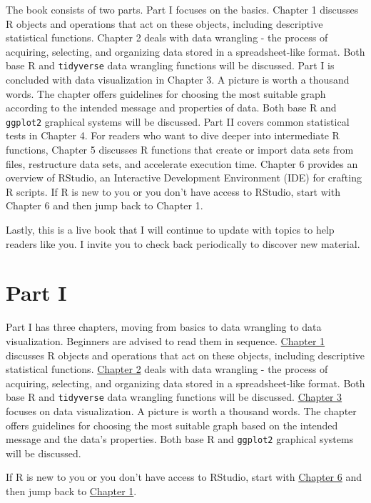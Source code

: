 \documentclass[
  letterpaper,
  DIV=11,
  numbers=noendperiod]{scrreprt}
\begin{document}

The book consists of two parts. Part I focuses on the basics. Chapter 1
discusses R objects and operations that act on these objects, including
descriptive statistical functions. Chapter 2 deals with data wrangling -
the process of acquiring, selecting, and organizing data stored in a
spreadsheet-like format. Both base R and \texttt{tidyverse} data
wrangling functions will be discussed. Part I is concluded with data
visualization in Chapter 3. A picture is worth a thousand words. The
chapter offers guidelines for choosing the most suitable graph according
to the intended message and properties of data. Both base R and
\texttt{ggplot2} graphical systems will be discussed. Part II covers
common statistical tests in Chapter 4. For readers who want to dive
deeper into intermediate R functions, Chapter 5 discusses R functions
that create or import data sets from files, restructure data sets, and
accelerate execution time. Chapter 6 provides an overview of RStudio, an
Interactive Development Environment (IDE) for crafting R scripts. If R
is new to you or you don't have access to RStudio, start with Chapter 6
and then jump back to Chapter 1.

Lastly, this is a live book that I will continue to update with topics
to help readers like you. I invite you to check back periodically to
discover new material.

\part{Part I}

Part I has three chapters, moving from basics to data wrangling to data
visualization. Beginners are advised to read them in sequence.
\href{@sec-01-basic-r}{Chapter 1} discusses R objects and operations
that act on these objects, including descriptive statistical functions.
\href{@sec-02-data-wrangling}{Chapter 2} deals with data wrangling - the
process of acquiring, selecting, and organizing data stored in a
spreadsheet-like format. Both base R and \texttt{tidyverse} data
wrangling functions will be discussed.
\href{@sec-03-data-visualization}{Chapter 3} focuses on data
visualization. A picture is worth a thousand words. The chapter offers
guidelines for choosing the most suitable graph based on the intended
message and the data's properties. Both base R and \texttt{ggplot2}
graphical systems will be discussed.

If R is new to you or you don't have access to RStudio, start with
\href{@sec-06-r-rstudio}{Chapter 6} and then jump back to
\href{@sec-01-basic-r}{Chapter 1}.
\end{document}
